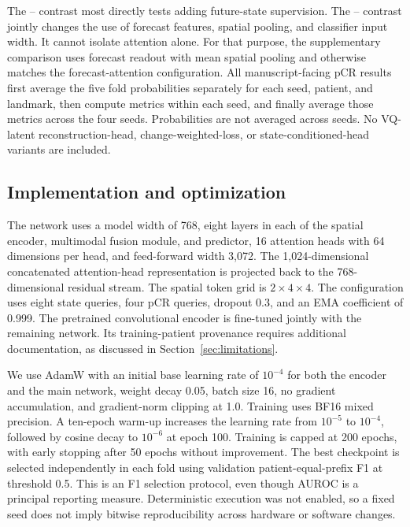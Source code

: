 The \direct{}--\nojepa{} contrast most directly tests adding future-state supervision. The \fullmodel{}--\direct{} contrast jointly changes the use of forecast features, spatial pooling, and classifier input width. It cannot isolate attention alone. For that purpose, the supplementary \meanmodel{} comparison uses forecast readout with mean spatial pooling and otherwise matches the forecast-attention configuration. All manuscript-facing pCR results first average the five fold probabilities separately for each seed, patient, and landmark, then compute metrics within each seed, and finally average those metrics across the four seeds. Probabilities are not averaged across seeds. No VQ-latent reconstruction-head, change-weighted-loss, or state-conditioned-head variants are included.

\subsection{Implementation and optimization}
The network uses a model width of 768, eight layers in each of the spatial encoder, multimodal fusion module, and predictor, 16 attention heads with 64 dimensions per head, and feed-forward width 3,072. The 1,024-dimensional concatenated attention-head representation is projected back to the 768-dimensional residual stream. The spatial token grid is $2\times4\times4$. The configuration uses eight state queries, four pCR queries, dropout 0.3, and an EMA coefficient of 0.999. The pretrained convolutional encoder is fine-tuned jointly with the remaining network. Its training-patient provenance requires additional documentation, as discussed in Section~\ref{sec:limitations}.

We use AdamW \citep{adamw2019} with an initial base learning rate of $10^{-4}$ for both the encoder and the main network, weight decay 0.05, batch size 16, no gradient accumulation, and gradient-norm clipping at 1.0. Training uses BF16 mixed precision. A ten-epoch warm-up increases the learning rate from $10^{-5}$ to $10^{-4}$, followed by cosine decay to $10^{-6}$ at epoch 100. Training is capped at 200 epochs, with early stopping after 50 epochs without improvement. The best checkpoint is selected independently in each fold using validation patient-equal-prefix F1 at threshold 0.5. This is an F1 selection protocol, even though AUROC is a principal reporting measure. Deterministic execution was not enabled, so a fixed seed does not imply bitwise reproducibility across hardware or software changes.

